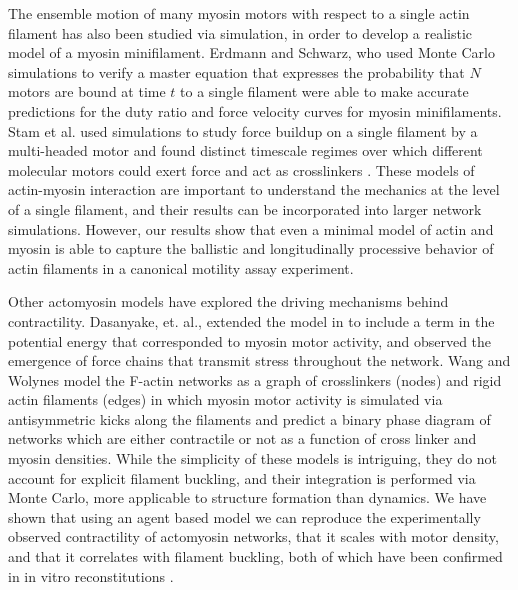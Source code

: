 \documentclass[11pt]{article}
\begin{document}
\par
The ensemble motion of many myosin motors with respect to a single actin filament has also been 
studied via simulation, in order to develop a realistic model of a myosin minifilament.
Erdmann and Schwarz, who used Monte Carlo simulations to verify a master equation that expresses 
the probability that $N$ motors are bound at time $t$ to a single filament\cite{erdmann2012} were able to make 
accurate predictions for the duty ratio and force velocity curves for myosin minifilaments. 
Stam et al. used simulations to study force buildup on a single filament by a multi-headed motor and found
distinct timescale regimes over which different {\color{red}molecular} motors could exert force and act as crosslinkers
\cite{stam2015}. These models of actin-myosin interaction are important to understand the mechanics at
the level of a single filament, and their results can be incorporated into larger network simulations.
However, our results show that even a minimal model of actin and myosin is able to capture the ballistic and
longitudinally processive behavior of actin filaments in a {\color{red}canonical} motility assay experiment.

\par
Other actomyosin models have explored the driving mechanisms behind contractility. 
Dasanyake, et. al., extended the model in \cite{head2003} to include a term in the potential energy that corresponded to
myosin motor activity, and observed the emergence of force chains that transmit stress throughout 
the network\cite{dasanyake2011}. 
Wang and Wolynes \cite{wang2012} model the F-actin networks as a graph of crosslinkers (nodes) and rigid actin filaments
(edges) in which myosin motor activity is simulated via antisymmetric kicks along the filaments and predict a
binary phase diagram of networks which are either contractile or not as a function of cross linker and myosin
densities. While the simplicity of these models is intriguing, they do not account for explicit filament buckling, 
and their integration is performed via Monte Carlo, more applicable to structure formation than dynamics.
We have shown that using an agent based model we can reproduce the experimentally observed contractility of actomyosin networks, 
that it scales with motor density, and that it correlates with filament buckling, both of which have been confirmed in in
vitro reconstitutions \cite{murrell2012,murrell2014}.
\end{document}
